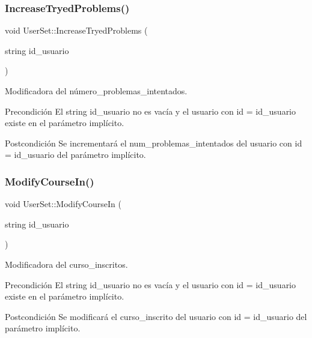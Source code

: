 \subsubsection{\texorpdfstring{Increase\+Tryed\+Problems()}{IncreaseTryedProblems()}}
{\footnotesize\ttfamily void User\+Set\+::\+Increase\+Tryed\+Problems (\begin{DoxyParamCaption}\item[{string}]{id\+\_\+usuario }\end{DoxyParamCaption})}



Modificadora del número\+\_\+problemas\+\_\+intentados. 

\begin{DoxyPrecond}{Precondición}
El string id\+\_\+usuario no es vacía y el usuario con id = id\+\_\+usuario existe en el parámetro implícito. 
\end{DoxyPrecond}
\begin{DoxyPostcond}{Postcondición}
Se incrementará el num\+\_\+problemas\+\_\+intentados del usuario con id = id\+\_\+usuario del parámetro implícito. 
\end{DoxyPostcond}
\mbox{\label{class_user_set_af618063be593ccc2c3605a7d75773437}} 
\subsubsection{\texorpdfstring{Modify\+Course\+In()}{ModifyCourseIn()}}
{\footnotesize\ttfamily void User\+Set\+::\+Modify\+Course\+In (\begin{DoxyParamCaption}\item[{string}]{id\+\_\+usuario }\end{DoxyParamCaption})}



Modificadora del curso\+\_\+inscritos. 

\begin{DoxyPrecond}{Precondición}
El string id\+\_\+usuario no es vacía y el usuario con id = id\+\_\+usuario existe en el parámetro implícito. 
\end{DoxyPrecond}
\begin{DoxyPostcond}{Postcondición}
Se modificará el curso\+\_\+inscrito del usuario con id = id\+\_\+usuario del parámetro implícito. 
\end{DoxyPostcond}
\mbox{\label{class_user_set_a4618efff11bc85371b754ee58e138ba4}} 
